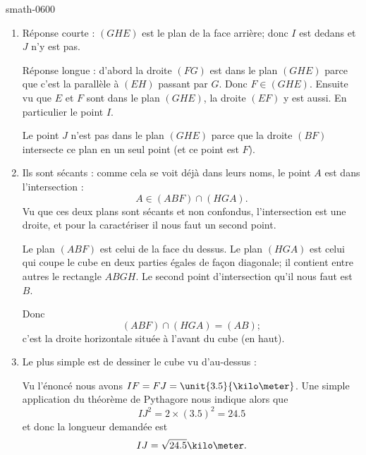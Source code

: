 
\begin{corrige}{smath-0600}

    \begin{enumerate}
        \item
            Réponse courte : \( (GHE)\) est le plan de la face arrière; donc \( I\) est dedans et \( J\) n'y est pas.

            Réponse longue : d'abord la droite \( (FG)\) est dans le plan \( (GHE)\) parce que c'est la parallèle à \( (EH)\) passant par \( G\). Donc \( F\in (GHE)\). Ensuite vu que \( E\) et \( F\) sont dans le plan \( (GHE)\), la droite \( (EF)\) y est aussi. En particulier le point \( I\).

            Le point \( J\) n'est pas dans le plan \( (GHE)\) parce que la droite \( (BF)\) intersecte ce plan en un seul point (et ce point est \( F\)).

        \item
            Ils sont sécants : comme cela se voit déjà dans leurs noms, le point \( A\) est dans l'intersection :
            \begin{equation}
                A\in (ABF)\cap(HGA).
            \end{equation}
            Vu que ces deux plans sont sécants et non confondus, l'intersection est une droite, et pour la caractériser il nous faut un second point.

            Le plan \( (ABF)\) est celui de la face du dessus. Le plan \( (HGA)\) est celui qui coupe le cube en deux parties égales de façon diagonale; il contient entre autres le rectangle \( ABGH\). Le second point d'intersection qu'il nous faut est \( B\).

            Donc
            \begin{equation}
                (ABF)\cap(HGA)=(AB);
            \end{equation}
            c'est la droite horizontale située à l'avant du cube (en haut).

        \item   \label{ItemECveWvo}
            Le plus simple est de dessiner le cube vu d'au-dessus :
            \begin{center}
                
            \end{center}
            Vu l'énoncé nous avons \( IF=FJ=\unit{3.5}{\kilo\meter}\). Une simple application du théorème de Pythagore nous indique alors que
            \begin{equation}
                IJ^2=2\times (3.5)^2=24.5
            \end{equation}
            et donc la longueur demandée est
            \begin{equation}
                IJ=\sqrt{24.5}\kilo\meter.
            \end{equation}
            
    \end{enumerate}

\end{corrige}
